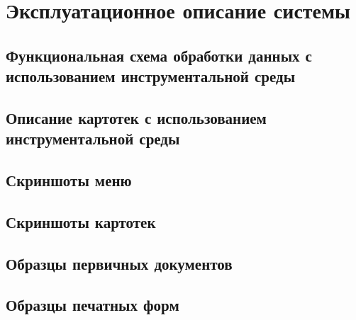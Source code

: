 \section{Эксплуатационное описание системы}

\subsection{Функциональная схема обработки данных с использованием инструментальной среды}
\subsection{Описание картотек с использованием инструментальной среды}
\subsection{Скриншоты меню}
\subsection{Скриншоты картотек}
\subsection{Образцы первичных документов}
\subsection{Образцы печатных форм}

